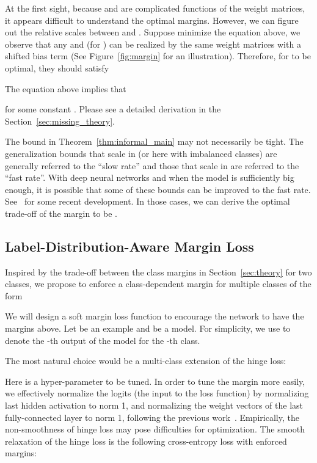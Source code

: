 \documentclass{article}
\begin{document}
At the first sight, because  and  are complicated functions of the weight matrices, it appears difficult to understand the optimal margins. However, we can figure out the relative scales between  and .  Suppose  minimize the equation above, we observe that any  and  (for ) can be realized by the same weight matrices with a shifted bias term (See Figure~\ref{fig:margin} for an illustration). Therefore, for  to be optimal, they should satisfy
 
The equation above implies that 

for some constant . Please see a detailed derivation in the Section~\ref{sec:missing_theory}. 

 The bound in Theorem~\ref{thm:informal_main} may not necessarily be tight. The generalization bounds that scale in  (or  here with imbalanced classes) are generally referred to the ``slow rate'' and those that scale in  are referred to the ``fast rate''. With deep neural networks and when the model is sufficiently big enough, it is possible that some of these bounds can be improved to the fast rate. See~\citep{wei2019improved} for some recent development. In those cases, we can derive the optimal trade-off of the margin to be . 






\subsection{Label-Distribution-Aware Margin Loss} \label{sec:loss}

Inspired by the trade-off between the class margins in Section~\ref{sec:theory} for two classes, we propose to enforce a class-dependent margin for multiple classes of the form 


We will design a soft margin loss function to encourage the network to have the margins above. Let  be an example and  be a model. For simplicity, we use  to denote the -th output of the model for the -th class. 

The most natural choice  would be a multi-class extension of the hinge loss:


Here  is a hyper-parameter to be tuned. In order to tune the margin more easily, we effectively normalize the logits (the input to the loss function) by normalizing last hidden activation to  norm 1, and normalizing the weight vectors of the last fully-connected layer to  norm 1, following the previous work~\citep{wang2018additive}. Empirically, the non-smoothness of hinge loss may pose difficulties for optimization. The smooth relaxation of the hinge loss is the following cross-entropy loss with enforced margins: 
\end{document}

